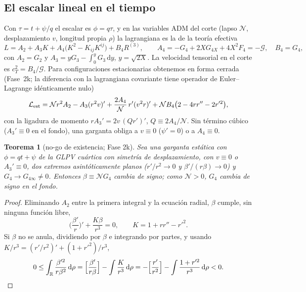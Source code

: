\documentclass[11pt,a4paper]{article}
\newtheorem{teorema}{Teorema}
\theoremstyle{remark}
\newcommand{\G}{\mathcal G}
\newcommand{\Ncal}{\mathcal N}
\newcommand{\dd}{\mathrm d}
\begin{document}
\subsection{El escalar lineal en el tiempo}

Con $\tau=t+\psi/q$ el escalar es $\phi=q\tau$, y en las variables ADM del corte (lapso $\Ncal$, desplazamiento $v$, longitud propia $\rho$) la lagrangiana es la de la teoría efectiva~\cite{GLPV}
\begin{equation}
L=A_2+A_3K+A_4\big(K^2-K_{ij}K^{ij}\big)+B_4R^{(3)},\qquad A_4=-G_4+2XG_{4X}+4X^2F_4=-\G,\quad B_4=G_4 ,
\end{equation}
con $A_2=G_2$ y $A_3=yG_3-\int_0^yG_3\,\dd y$, $y=\sqrt{2X}$. La velocidad tensorial en el corte es $c_T^2=B_4/\G$. Para configuraciones estacionarias obtenemos en forma cerrada (Fase~2k; la diferencia con la lagrangiana covariante tiene operador de Euler--Lagrange idénticamente nulo)
\begin{equation}
\mathcal L_{\rm est}=\Ncal r^2A_2-A_3(r^2v)'+\frac{2A_4}{\Ncal}\,r'(v^2r)'+\Ncal B_4\big(2-4rr''-2r'^2\big),
\end{equation}
con la ligadura de momento $rA_3'=2v\,(Qr')'$, $Q\equiv2A_4/\Ncal$. Sin término cúbico ($A_3'\equiv0$ en el fondo), una garganta obliga a $v\equiv0$ ($\psi'=0$) o a $A_4\equiv0$.

\begin{teorema}[no-go de existencia; Fase 2k]\label{teo:beta}
Sea una garganta estática con $\phi=qt+\psi$ de la GLPV cuártica con simetría de desplazamiento, con $v\equiv0$ o $A_3'\equiv0$, dos extremos asintóticamente planos ($r'/r^2\to0$ y $\beta'/(r\beta)\to0$) y $G_4\to G_{4\infty}\neq0$. Entonces $\beta\equiv\Ncal G_4$ cambia de signo; como $\Ncal>0$, $G_4$ cambia de signo en el fondo.
\end{teorema}

\begin{proof}
Eliminando $A_2$ entre la primera integral y la ecuación radial, $\beta$ cumple, sin ninguna función libre,
\begin{equation}
\Big(\frac{\beta'}{r}\Big)'+\frac{K\beta}{r^3}=0,\qquad K=1+rr''-r'^2 .
\label{eq:beta}
\end{equation}
Si $\beta$ no se anula, dividiendo por $\beta$ e integrando por partes, y usando $K/r^3=(r'/r^2)'+(1+r'^2)/r^3$,
\begin{equation}
0\le\int_{\mathbb R}\frac{\beta'^2}{r\beta^2}\,\dd\rho=\Big[\frac{\beta'}{r\beta}\Big]-\int\frac{K}{r^3}\,\dd\rho=-\Big[\frac{r'}{r^2}\Big]-\int\frac{1+r'^2}{r^3}\,\dd\rho<0. \qedhere
\end{equation}
\end{proof}
\end{document}

